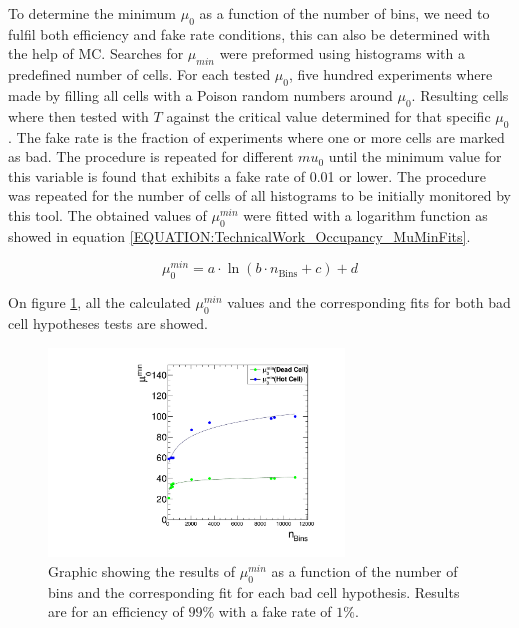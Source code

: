 To determine the minimum $\mu_0$ as a function of the number of bins, we need to fulfil both efficiency and fake rate conditions, this can also be determined with the help of \gls{MC}. Searches for $\mu_{min}$ were preformed using histograms with a predefined number of cells. For each tested $\mu_{0}$, five hundred experiments where made by filling all cells with a Poison random numbers around $\mu_0$. Resulting cells where then tested with $T$ against the critical value determined for that specific $\mu_0$. The fake rate is the fraction of experiments where one or more cells are marked as bad. The procedure is repeated for different $mu_{0}$ until the minimum value for this variable is found that exhibits a fake rate of 0.01 or lower. The procedure was repeated for the number of cells of all histograms to be initially monitored by this tool. The obtained values of $\mu_0^{min}$ were fitted with a logarithm function as showed in equation \ref{EQUATION:TechnicalWork_Occupancy_MuMinFits}.

\begin{equation}
\mu_{0}^{min}= a \cdot \ln(b \cdot n_{\text{Bins}} + c) + d
\label{EQUATION:TechnicalWork_Occupancy_MuMinFits}
\end{equation}

On figure \ref{FIGURE:TechnicalWork_L1TOccupancyMuMin}, all the calculated $\mu_0^{min}$ values and the corresponding fits for both bad cell hypotheses tests are showed.

\begin{figure}[!htb]
\centering
\includegraphics[width=0.70\textwidth]{Chapter03/L1TOnline/Images/L1TOccupancy_MuMin.pdf}
\caption{Graphic showing the results of $\mu_0^{min}$ as a function of the number of bins and the corresponding fit for each bad cell hypothesis. Results are for an efficiency of $99\%$ with a fake rate of $1\%$.}
\label{FIGURE:TechnicalWork_L1TOccupancyMuMin}
\end{figure}

